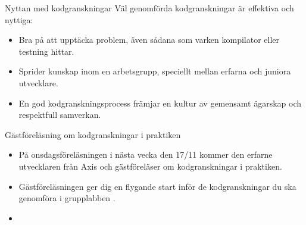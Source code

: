\begin{Slide}{Nyttan med kodgranskningar}
Väl genomförda kodgranskningar är effektiva och nyttiga:
\begin{itemize}
\item Bra på att upptäcka problem, även sådana som varken kompilator eller testning hittar.
\item Sprider kunskap inom en arbetsgrupp, speciellt mellan erfarna och juniora utvecklare.
\item En god kodgranskningsprocess främjar en kultur av gemensamt ägarskap och respektfull samverkan.
\end{itemize}
\end{Slide}




\ifkompendium\else
\begin{Slide}{Gästföreläsning om kodgranskningar i praktiken}
\begin{itemize}
\item På onsdagsföreläsningen i nästa vecka den 17/11 kommer den erfarne utvecklaren  från Axis och gästföreläser om kodgranskningar i praktiken. 
\item Gästföreläsningen ger dig en flygande start inför de kodgranskningar du ska genomföra i grupplabben .
\item {}
\end{itemize}
\end{Slide}
\fi
